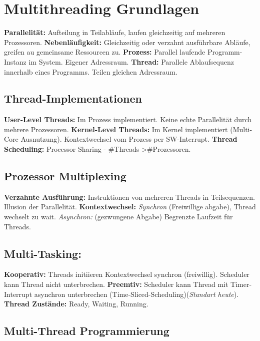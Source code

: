 
\section{Multithreading Grundlagen}
\textbf{Parallelität:} Aufteilung in Teilabläufe, laufen gleichzeitig auf mehreren Prozessoren.
\textbf{Nebenläufigkeit:} Gleichzeitig oder verzahnt ausführbare Abläufe, greifen au gemeinsame Ressourcen zu.
\textbf{Prozess:} Parallel laufende Programm-Instanz im System. Eigener Adressraum.
\textbf{Thread:} Parallele Ablaufsequenz innerhalb eines Programms. Teilen gleichen Adressraum.

\subsection{Thread-Implementationen}
\textbf{User-Level Threads:} Im Prozess implementiert.
Keine echte Parallelität durch mehrere Prozessoren.
\textbf{Kernel-Level Threads:} Im Kernel implementiert (Multi-Core Ausnutzung).
Kontextwechsel vom Prozess per SW-Interrupt.
\textbf{Thread Scheduling:} Processor Sharing - \#Threads \textgreater \#Prozessoren.

\subsection{Prozessor Multiplexing}
\textbf{Verzahnte Ausführung:} Instruktionen von mehreren Threads in Teilsequenzen. Illusion der Parallelität.
\textbf{Kontextwechsel:} \textit{Synchron} (Freiwillige abgabe), Thread wechselt zu wait. \textit{Asynchron:} (gezwungene Abgabe) Begrenzte Laufzeit für Threads.

\subsection{Multi-Tasking:}
\textbf{Kooperativ:} Threads initiieren Kontextwechsel synchron (freiwillig). Scheduler kann Thread nicht unterbrechen.
\textbf{Preemtiv:} Scheduler kann Thread mit Timer-Interrupt asynchron unterbrechen (Time-Sliced-Scheduling)(\textit{Standart heute}).
\textbf{Thread Zustände:} Ready, Waiting, Running.

\subsection{Multi-Thread Programmierung}
